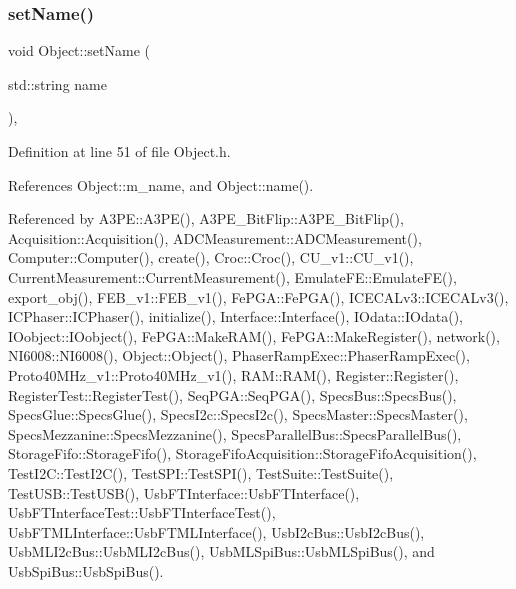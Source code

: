 \subsubsection{\texorpdfstring{set\+Name()}{setName()}}
{\footnotesize\ttfamily void Object\+::set\+Name (\begin{DoxyParamCaption}\item[{std\+::string}]{name }\end{DoxyParamCaption})\hspace{0.3cm}{\ttfamily [inline]}, {\ttfamily [inherited]}}



Definition at line 51 of file Object.\+h.



References Object\+::m\+\_\+name, and Object\+::name().



Referenced by A3\+P\+E\+::\+A3\+P\+E(), A3\+P\+E\+\_\+\+Bit\+Flip\+::\+A3\+P\+E\+\_\+\+Bit\+Flip(), Acquisition\+::\+Acquisition(), A\+D\+C\+Measurement\+::\+A\+D\+C\+Measurement(), Computer\+::\+Computer(), create(), Croc\+::\+Croc(), C\+U\+\_\+v1\+::\+C\+U\+\_\+v1(), Current\+Measurement\+::\+Current\+Measurement(), Emulate\+F\+E\+::\+Emulate\+F\+E(), export\+\_\+obj(), F\+E\+B\+\_\+v1\+::\+F\+E\+B\+\_\+v1(), Fe\+P\+G\+A\+::\+Fe\+P\+G\+A(), I\+C\+E\+C\+A\+Lv3\+::\+I\+C\+E\+C\+A\+Lv3(), I\+C\+Phaser\+::\+I\+C\+Phaser(), initialize(), Interface\+::\+Interface(), I\+Odata\+::\+I\+Odata(), I\+Oobject\+::\+I\+Oobject(), Fe\+P\+G\+A\+::\+Make\+R\+A\+M(), Fe\+P\+G\+A\+::\+Make\+Register(), network(), N\+I6008\+::\+N\+I6008(), Object\+::\+Object(), Phaser\+Ramp\+Exec\+::\+Phaser\+Ramp\+Exec(), Proto40\+M\+Hz\+\_\+v1\+::\+Proto40\+M\+Hz\+\_\+v1(), R\+A\+M\+::\+R\+A\+M(), Register\+::\+Register(), Register\+Test\+::\+Register\+Test(), Seq\+P\+G\+A\+::\+Seq\+P\+G\+A(), Specs\+Bus\+::\+Specs\+Bus(), Specs\+Glue\+::\+Specs\+Glue(), Specs\+I2c\+::\+Specs\+I2c(), Specs\+Master\+::\+Specs\+Master(), Specs\+Mezzanine\+::\+Specs\+Mezzanine(), Specs\+Parallel\+Bus\+::\+Specs\+Parallel\+Bus(), Storage\+Fifo\+::\+Storage\+Fifo(), Storage\+Fifo\+Acquisition\+::\+Storage\+Fifo\+Acquisition(), Test\+I2\+C\+::\+Test\+I2\+C(), Test\+S\+P\+I\+::\+Test\+S\+P\+I(), Test\+Suite\+::\+Test\+Suite(), Test\+U\+S\+B\+::\+Test\+U\+S\+B(), Usb\+F\+T\+Interface\+::\+Usb\+F\+T\+Interface(), Usb\+F\+T\+Interface\+Test\+::\+Usb\+F\+T\+Interface\+Test(), Usb\+F\+T\+M\+L\+Interface\+::\+Usb\+F\+T\+M\+L\+Interface(), Usb\+I2c\+Bus\+::\+Usb\+I2c\+Bus(), Usb\+M\+L\+I2c\+Bus\+::\+Usb\+M\+L\+I2c\+Bus(), Usb\+M\+L\+Spi\+Bus\+::\+Usb\+M\+L\+Spi\+Bus(), and Usb\+Spi\+Bus\+::\+Usb\+Spi\+Bus().


